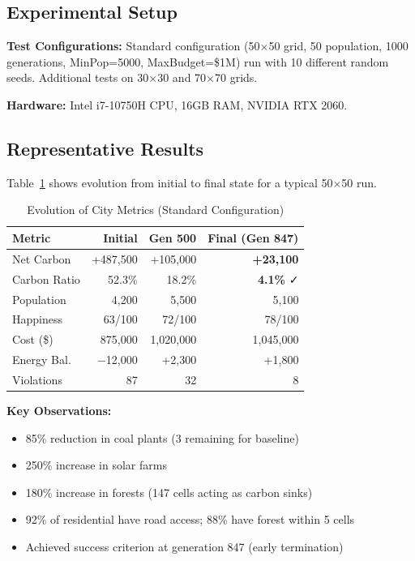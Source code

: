 \documentclass[conference]{IEEEtran}
\begin{document}
\subsection{Experimental Setup}

\textbf{Test Configurations:} Standard configuration (50$\times$50 grid, 50 population, 1000 generations, MinPop=5000, MaxBudget=\$1M) run with 10 different random seeds. Additional tests on 30$\times$30 and 70$\times$70 grids.

\textbf{Hardware:} Intel i7-10750H CPU, 16GB RAM, NVIDIA RTX 2060.

\subsection{Representative Results}

Table~\ref{tab:results} shows evolution from initial to final state for a typical 50$\times$50 run.

\begin{table}[htbp]
\caption{Evolution of City Metrics (Standard Configuration)}
\begin{center}
\begin{tabular}{lrrr}
\toprule
\textbf{Metric} & \textbf{Initial} & \textbf{Gen 500} & \textbf{Final (Gen 847)} \\
\midrule
Net Carbon & +487,500 & +105,000 & \textbf{+23,100} \\
Carbon Ratio & 52.3\% & 18.2\% & \textbf{4.1\%} ✓ \\
Population & 4,200 & 5,500 & 5,100 \\
Happiness & 63/100 & 72/100 & 78/100 \\
Cost (\$) & 875,000 & 1,020,000 & 1,045,000 \\
Energy Bal. & $-$12,000 & +2,300 & +1,800 \\
Violations & 87 & 32 & 8 \\
\bottomrule
\end{tabular}
\label{tab:results}
\end{center}
\end{table}

\textbf{Key Observations:}
\begin{itemize}
    \item 85\% reduction in coal plants (3 remaining for baseline)
    \item 250\% increase in solar farms
    \item 180\% increase in forests (147 cells acting as carbon sinks)
    \item 92\% of residential have road access; 88\% have forest within 5 cells
    \item Achieved success criterion at generation 847 (early termination)
\end{itemize}
\end{document}
